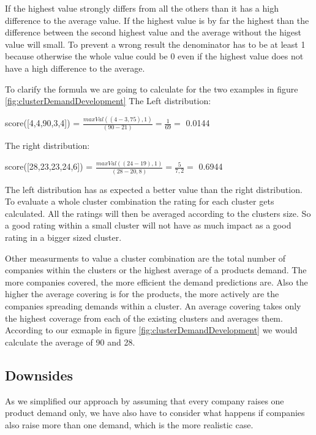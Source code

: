 If the highest value strongly differs from all the others than it has a high difference to the average value.
If the highest value is by far the highest than the difference between the second highest value and the average without
the higest value will small. To prevent a wrong result the denominator has to be at least 1 because otherwise the
whole value could be 0 even if the highest value does not have a high difference to the average.

To clarify the formula we are going to calculate for the two examples in figure \ref{fig:clusterDemandDevelopment}
The Left distribution:
\begin{center}
  score([4,4,90,3,4]) =  {\Large $\frac{ maxVal( ( 4 - 3,75 ), 1 ) }{ ( 90 - 21 ) } = \frac{ 1 }{ 69 } =$} 0.0144 \\
\end{center}

The right distribution:
\begin{center}
  score([28,23,23,24,6]) =  {\Large $\frac{ maxVal( ( 24 - 19 ), 1 ) }{ ( 28 - 20,8 ) } = \frac{ 5 }{ 7,2 } =$} 0.6944 \\
\end{center}


The left distribution has as expected a better value than the right distribution. To evaluate a whole cluster combination
the rating for each cluster gets calculated. All the ratings will then be averaged according to the clusters size.
So a good rating within a small cluster will not have as much impact as a good rating in a bigger sized cluster.

Other measurments to value a cluster combination are the total number of companies within the clusters or the
highest average of a products demand. The more companies covered, the more efficient the demand predictions are.
Also the higher the average covering is for the products, the more actively are the companies spreading demands
within a cluster. An average covering takes only the highest coverage from each of the existing clusters and averages
them. According to our exmaple in figure \ref{fig:clusterDemandDevelopment} we would calculate the average of 90 and 28.

\subsection{Downsides}
As we simplified our approach by assuming that every company raises one product demand only, we have also have to
consider what happens if companies also raise more than one demand, which is the more realistic case.


